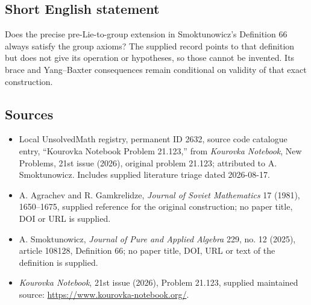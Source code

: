 \documentclass[11pt]{article}
\begin{document}
\subsection{Short English statement}
Does the precise pre-Lie-to-group extension in Smoktunowicz's Definition 66 always satisfy the group axioms? The supplied record points to that definition but does not give its operation or hypotheses, so those cannot be invented. Its brace and Yang--Baxter consequences remain conditional on validity of that exact construction.
\subsection{Sources}
\begin{itemize}
\item Local UnsolvedMath registry, permanent ID 2632, source code catalogue entry, ``Kourovka Notebook Problem 21.123,'' from \emph{Kourovka Notebook}, New Problems, 21st issue (2026), original problem 21.123; attributed to A. Smoktunowicz. Includes supplied literature triage dated 2026-08-17.
\item A. Agrachev and R. Gamkrelidze, \emph{Journal of Soviet Mathematics} 17 (1981), 1650--1675, supplied reference for the original construction; no paper title, DOI or URL is supplied.
\item A. Smoktunowicz, \emph{Journal of Pure and Applied Algebra} 229, no. 12 (2025), article 108128, Definition 66; no paper title, DOI, URL or text of the definition is supplied.
\item \emph{Kourovka Notebook}, 21st issue (2026), Problem 21.123, supplied maintained source: \url{https://www.kourovka-notebook.org/}.
\end{itemize}
\end{document}
